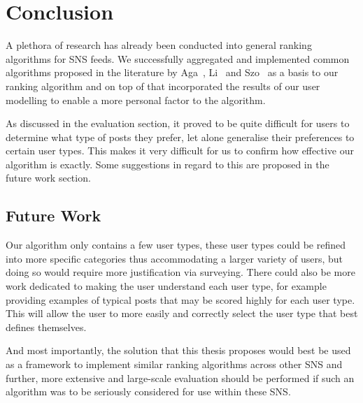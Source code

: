 \chapter{Conclusion}\label{ch:conclusion}

A plethora of research has already been conducted into general ranking algorithms for SNS feeds. We successfully aggregated and implemented common algorithms proposed in the literature by Aga~\cite{Aga2014}, Li~\cite{LiTiaLee2010} and Szo~\cite{szomszor2008semantic} as a basis to our ranking algorithm and on top of that incorporated the results of our user modelling to enable a more personal factor to the algorithm.

As discussed in the evaluation section, it proved to be quite difficult for users to determine what type of posts they prefer, let alone generalise their preferences to certain user types. This makes it very difficult for us to confirm how effective our algorithm is exactly. Some suggestions in regard to this are proposed in the future work section.

\section{Future Work}
 
Our algorithm only contains a few user types, these user types could be refined into more specific categories thus accommodating a larger variety of users, but doing so would require more justification via surveying. There could also be more work dedicated to making the user understand each user type, for example providing examples of typical posts that may be scored highly for each user type. This will allow the user to more easily and correctly select the user type that best defines themselves. 

And most importantly, the solution that this thesis proposes would best be used as a framework to implement similar ranking algorithms across other SNS and further, more extensive and large-scale evaluation should be performed if such an algorithm was to be seriously considered for use within these SNS.